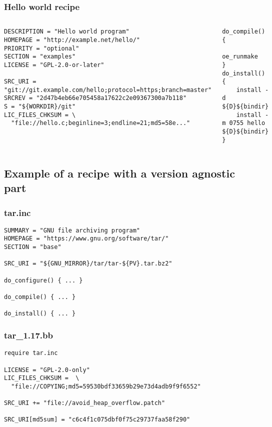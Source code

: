 \begin{frame}[fragile]
  \frametitle{Hello world recipe}
  \begin{columns}
  \begin{block}{}
    \begin{verbatim}
DESCRIPTION = "Hello world program"
HOMEPAGE = "http://example.net/hello/"
PRIORITY = "optional"
SECTION = "examples"
LICENSE = "GPL-2.0-or-later"

SRC_URI = "git://git.example.com/hello;protocol=https;branch=master"
SRCREV = "2d47b4eb66e705458a17622c2e09367300a7b118"
S = "${WORKDIR}/git"
LIC_FILES_CHKSUM = \
  "file://hello.c;beginline=3;endline=21;md5=58e..."
    \end{verbatim}
  \end{block}

  \begin{block}{}
    \begin{verbatim}
do_compile() {
    oe_runmake
}
do_install() {
    install -d ${D}${bindir}
    install -m 0755 hello ${D}${bindir}
}
    \end{verbatim}
  \end{block}
  \end{columns}
\end{frame}

\subsection{Example of a recipe with a version agnostic part}

\begin{frame}[fragile]
  \frametitle{tar.inc}
  \begin{block}{}
    \begin{verbatim}
SUMMARY = "GNU file archiving program"
HOMEPAGE = "https://www.gnu.org/software/tar/"
SECTION = "base"

SRC_URI = "${GNU_MIRROR}/tar/tar-${PV}.tar.bz2"

do_configure() { ... }

do_compile() { ... }

do_install() { ... }
    \end{verbatim}
  \end{block}
\end{frame}

\begin{frame}[fragile]
  \frametitle{tar\_1.17.bb}
  \begin{block}{}
    \begin{verbatim}
require tar.inc

LICENSE = "GPL-2.0-only"
LIC_FILES_CHKSUM =  \
  "file://COPYING;md5=59530bdf33659b29e73d4adb9f9f6552"

SRC_URI += "file://avoid_heap_overflow.patch"

SRC_URI[md5sum] = "c6c4f1c075dbf0f75c29737faa58f290"
    \end{verbatim}
  \end{block}
\end{frame}

